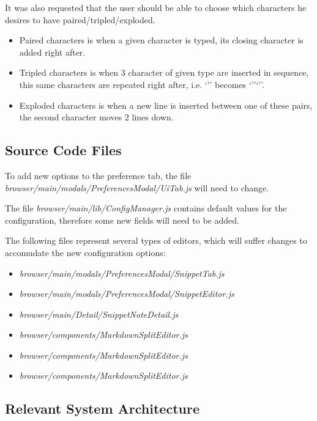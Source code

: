 It was also requested that the user should be able to choose which
characters he desires to have paired/tripled/exploded.

\begin{itemize}
\item
  Paired characters is when a given character is typed, its closing
  character is added right after.
\item
  Tripled characters is when 3 character of given type are inserted in
  sequence, this same characters are repeated right after, i.e. `''
  becomes `''`''.
\item
  Exploded characters is when a new line is inserted between one of
  these pairs, the second character moves 2 lines down.
\end{itemize}

\subsection{Source Code Files}\label{source-code-files}

To add new options to the preference tab, the file
\emph{browser/main/modals/PreferencesModal/UiTab.js} will need to
change.

The file \emph{browser/main/lib/ConfigManager.js} contains default
values for the configuration, therefore some new fields will need to be
added.

The following files represent several types of editors, which will
suffer changes to accomudate the new configuration options:

\begin{itemize}
\tightlist
\item
  \emph{browser/main/modals/PreferencesModal/SnippetTab.js}
\item
  \emph{browser/main/modals/PreferencesModal/SnippetEditor.js}
\item
  \emph{browser/main/Detail/SnippetNoteDetail.js}
\item
  \emph{browser/components/MarkdownSplitEditor.js}
\item
  \emph{browser/components/MarkdownSplitEditor.js}
\item
  \emph{browser/components/MarkdownSplitEditor.js}
\end{itemize}

\subsection{Relevant System
Architecture}\label{relevant-system-architecture}

